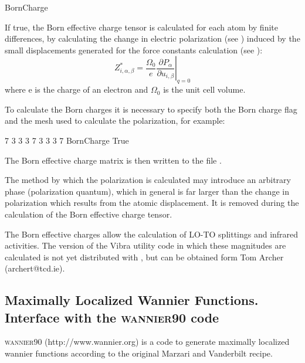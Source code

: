 \begin{fdflogicalF}{BornCharge}

  If true, the Born effective charge tensor is calculated for each
  atom by finite differences, by calculating the change in electric
  polarization (see ) induced by the small
  displacements generated for the force constants calculation (see
   ):
  \begin{equation}
    \label{eq:effective_charge}
    Z^*_{i,\alpha,\beta}=\frac{\Omega_0}{e} \left. {\frac{\partial{P_\alpha}}
          {\partial{u_{i,\beta}}}}\right|_{q=0}
  \end{equation}
  where e is the charge of an electron and $\Omega_0$ is the unit cell
  volume.

  To calculate the Born charges it is necessary to specify both the
  Born charge flag and the mesh used to calculate the polarization,
  for example:
  \begin{fdfexample}
      7  3  3
      3  7  3
      3  3  7
    BornCharge True
  \end{fdfexample}

  The Born effective charge matrix is then written to the file
  .

  The method by which the polarization is calculated may introduce an
  arbitrary phase (polarization quantum), which in general is far
  larger than the change in polarization which results from the atomic
  displacement. It is removed during the calculation of the Born
  effective charge tensor.

  The Born effective charges allow the calculation of LO-TO splittings
  and infrared activities. The version of the Vibra utility code in
  which these magnitudes are calculated is not yet distributed with
  \siesta, but can be obtained form Tom Archer (archert@tcd.ie).

\end{fdflogicalF}



\subsection[Maximally Localized Wannier Functions]%
{Maximally Localized Wannier Functions. \\
    Interface with the \textsc{wannier90} code}

\textsc{wannier90} (http://www.wannier.org) is a code to generate
maximally localized wannier functions according to the original
Marzari and Vanderbilt recipe.

